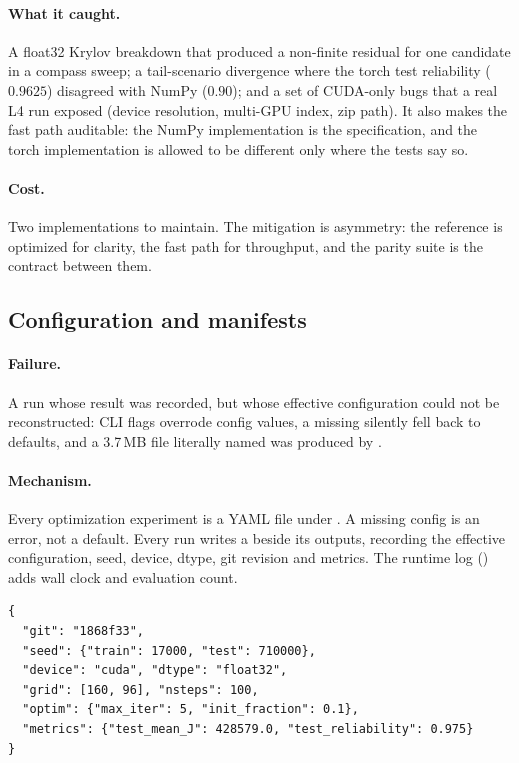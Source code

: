 \paragraph{What it caught.} A float32 Krylov breakdown that produced a
non-finite residual for one candidate in a compass sweep; a tail-scenario
divergence where the torch test reliability ($0.9625$) disagreed with NumPy
($0.90$); and a set of CUDA-only bugs that a real L4 run exposed (device
resolution, multi-GPU index, zip path). It also makes the fast path auditable:
the NumPy implementation is the specification, and the torch implementation is
allowed to be different only where the tests say so.

\paragraph{Cost.} Two implementations to maintain. The mitigation is
asymmetry: the reference is optimized for clarity, the fast path for throughput,
and the parity suite is the contract between them.

\subsection{Configuration and manifests}
\label{sec:config}

\paragraph{Failure.} A run whose result was recorded, but whose effective
configuration could not be reconstructed: CLI flags overrode config values, a
missing  silently fell back to defaults, and a 3.7\,MB file
literally named  was produced by .

\paragraph{Mechanism.} Every optimization experiment is a YAML file under
. A missing config is an error, not a default. Every run
writes a  beside its outputs, recording the effective
configuration, seed, device, dtype, git revision and metrics. The runtime log
() adds wall clock and evaluation count.

\begin{lstlisting}[caption={The manifest is the run's identity card.}]
{
  "git": "1868f33",
  "seed": {"train": 17000, "test": 710000},
  "device": "cuda", "dtype": "float32",
  "grid": [160, 96], "nsteps": 100,
  "optim": {"max_iter": 5, "init_fraction": 0.1},
  "metrics": {"test_mean_J": 428579.0, "test_reliability": 0.975}
}
\end{lstlisting}

